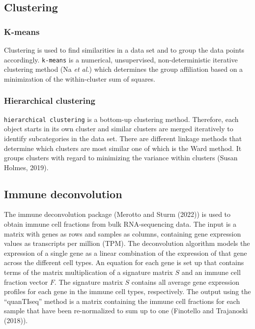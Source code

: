 \documentclass[
  parskip,
  oneside]{scrreprt}
\begin{document}
\hypertarget{clustering}{%
\subsection{Clustering}\label{clustering}}

\hypertarget{k-means}{%
\subsubsection{K-means}\label{k-means}}

Clustering is used to find similarities in a data set and to group the
data points accordingly. \texttt{k-means} is a numerical, unsupervised,
non-deterministic iterative clustering method (Na \emph{et al.}) which
determines the group affiliation based on a minimization of the
within-cluster sum of squares.

\hypertarget{hierarchical-clustering}{%
\subsubsection{Hierarchical clustering}\label{hierarchical-clustering}}

\texttt{hierarchical\ clustering} is a bottom-up clustering method.
Therefore, each object starts in its own cluster and similar clusters
are merged iteratively to identify subcategories in the data set. There
are different linkage methods that determine which clusters are most
similar one of which is the Ward method. It groups clusters with regard
to minimizing the variance within clusters (Susan Holmes, 2019).

\hypertarget{immune-deconvolution}{%
\subsection{Immune deconvolution}\label{immune-deconvolution}}

The immune deconvolution package (Merotto and Sturm (2022)) is used to
obtain immune cell fractions from bulk RNA-sequencing data. The input is
a matrix with genes as rows and samples as columns, containing gene
expression values as transcripts per million (TPM). The deconvolution
algorithm models the expression of a single gene as a linear combination
of the expression of that gene across the different cell types. An
equation for each gene is set up that contains terms of the matrix
multiplication of a signature matrix \(S\) and an immune cell fraction
vector \(F\). The signature matrix \(S\) contains all average gene
expression profiles for each gene in the immune cell types,
respectively. The output using the ``quanTIseq'' method is a matrix
containing the immune cell fractions for each sample that have been
re-normalized to sum up to one (Finotello and Trajanoski (2018)).
\end{document}
